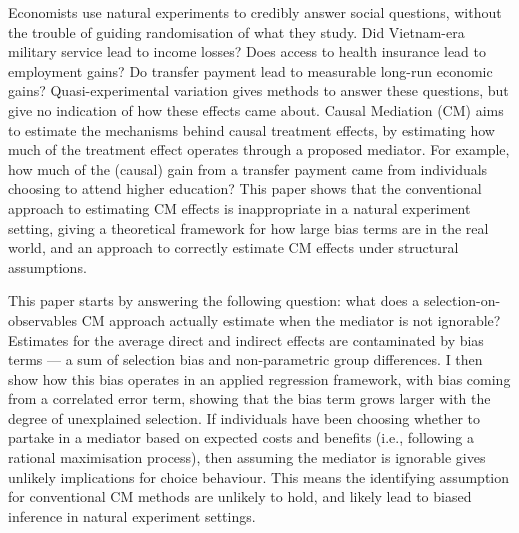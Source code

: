 Economists use natural experiments to credibly answer social questions, without the trouble of guiding randomisation of what they study.
Did Vietnam-era military service lead to income losses?
Does access to health insurance lead to employment gains?
Do transfer payment  lead to measurable long-run economic gains?
Quasi-experimental variation gives methods to answer these questions, but give no indication of how these effects came about.
Causal Mediation (CM) aims to estimate the mechanisms behind causal treatment effects, by estimating how much of the treatment effect operates through a proposed mediator.
For example, how much of the (causal) gain from a transfer payment came from individuals choosing to attend higher education?
This paper shows that the conventional approach to estimating CM effects is inappropriate in a natural experiment setting, giving a theoretical framework for how large bias terms are in the real world, and an approach to correctly estimate CM effects under structural assumptions.

This paper starts by answering the following question: what does a selection-on-observables CM approach actually estimate when the mediator is not ignorable?
Estimates for the average direct and indirect effects are contaminated by bias terms --- a sum of selection bias and non-parametric group differences.
I then show how this bias operates in an applied regression framework, with bias coming from a correlated error term, showing that the bias term grows larger with the degree of unexplained selection.
If individuals have been choosing whether to partake in a mediator based on expected costs and benefits (i.e., following a rational maximisation process), then assuming the mediator is ignorable gives unlikely implications for choice behaviour.
This means the identifying assumption for conventional CM methods are unlikely to hold, and likely lead to biased inference in natural experiment settings.

